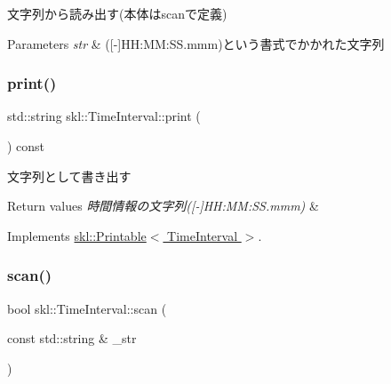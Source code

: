文字列から読み出す(本体はscanで定義) 


\begin{DoxyParams}{Parameters}
{\em str} & (\mbox{[}-\/\mbox{]}H\+H\+:\+MM\+:S\+S.\+mmm)という書式でかかれた文字列 \\
\hline
\end{DoxyParams}
\hypertarget{classskl_1_1_time_interval_a1605c779683229ccc9e714f651ab3b1d}{}\label{classskl_1_1_time_interval_a1605c779683229ccc9e714f651ab3b1d} 
\subsubsection{\texorpdfstring{print()}{print()}}
{\footnotesize\ttfamily std\+::string skl\+::\+Time\+Interval\+::print (\begin{DoxyParamCaption}{ }\end{DoxyParamCaption}) const\hspace{0.3cm}{\ttfamily [virtual]}}



文字列として書き出す 


\begin{DoxyRetVals}{Return values}
{\em 時間情報の文字列(\mbox{[}-\/\mbox{]}\+H\+H\+:\+M\+M\+:\+S\+S.\+mmm)} & \\
\hline
\end{DoxyRetVals}


Implements \hyperlink{classskl_1_1_printable}{skl\+::\+Printable$<$ Time\+Interval $>$}.

\hypertarget{classskl_1_1_time_interval_ac2ad9a1a830ce70e6702969815ca7468}{}\label{classskl_1_1_time_interval_ac2ad9a1a830ce70e6702969815ca7468} 
\subsubsection{\texorpdfstring{scan()}{scan()}}
{\footnotesize\ttfamily bool skl\+::\+Time\+Interval\+::scan (\begin{DoxyParamCaption}\item[{const std\+::string \&}]{\+\_\+str }\end{DoxyParamCaption})\hspace{0.3cm}{\ttfamily [virtual]}}




